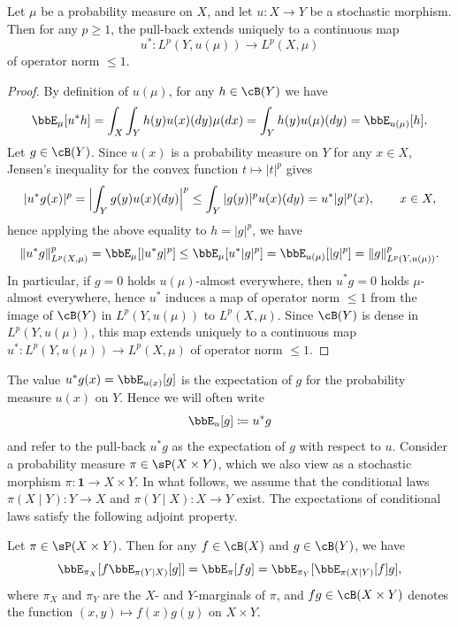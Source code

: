 \documentclass[12pt,reqno]{amsart}%
\theoremstyle{plain}
\theoremstyle{definition}
\def\abs#1{|#1|}
\def\dabs#1{\Vert#1\Vert}
\def\bsone{\boldsymbol{1}}
\begin{document}
\begin{lemma}\label{lem: Lp}
	Let $\mu$ be a probability measure on $X$, and let $u\colon X\rightarrow Y$ be a stochastic morphism.
	Then for any $p\geq1$, the pull-back extends uniquely to a continuous map
	\[
		u^*\colon L^p(Y,u(\mu))\rightarrow L^p(X,\mu)
	\]
	of operator norm $\leq1$.
\end{lemma}

\begin{proof}
	By definition of $u(\mu)$, for any $h\in\cB(Y)$ we have
	\[
		\bbE_\mu[u^*h]=\int_X\int_Yh(y)u(x)(dy)\mu(dx)=\int_Yh(y)u(\mu)(dy)=\bbE_{u(\mu)}[h].
	\]
	Let $g\in\cB(Y)$.  Since $u(x)$ is a probability measure on $Y$ for any $x\in X$,
	Jensen's inequality for the convex function $t\mapsto\abs{t}^p$ gives
	\[
		\abs{u^*g(x)}^p=\Bigl|\int_Yg(y)u(x)(dy)\Bigr|^p\leq\int_Y\abs{g(y)}^pu(x)(dy)=u^*\abs{g}^p(x),
		\qquad x\in X,
	\]
	hence applying the above equality to $h=\abs{g}^p$, we have
	\[
		\dabs{u^*g}^p_{L^p(X,\mu)}=\bbE_\mu[\abs{u^*g}^p]\leq\bbE_\mu[u^*\abs{g}^p]
		=\bbE_{u(\mu)}[\abs{g}^p]=\dabs{g}^p_{L^p(Y,u(\mu))}.
	\]
	In particular, if $g=0$ holds $u(\mu)$-almost everywhere, then $u^*g=0$ holds $\mu$-almost everywhere,
	hence $u^*$ induces a map of operator norm $\leq1$ from the image of $\cB(Y)$ in $L^p(Y,u(\mu))$
	to $L^p(X,\mu)$.  Since $\cB(Y)$ is dense in $L^p(Y,u(\mu))$, this map extends uniquely to a continuous map
	$u^*\colon L^p(Y,u(\mu))\rightarrow L^p(X,\mu)$ of operator norm $\leq1$.
\end{proof}

The value $u^*g(x)=\bbE_{u(x)}[g]$ is the expectation of $g$ for the probability measure $u(x)$ on $Y$.
Hence we will often write
\[
	\bbE_u[g]\coloneqq u^*g
\]
and refer to the pull-back $u^*g$ as the expectation of $g$ with respect to $u$.
Consider a probability measure $\pi\in\sP(X\times Y)$, which we also
view as a stochastic morphism $\pi\colon\bsone\rightarrow X\times Y$.
In what follows, we assume that
the conditional laws $\pi(X\mid Y)\colon Y\rightarrow X$ and $\pi(Y\mid X)\colon X\rightarrow Y$ exist.
The expectations of conditional laws satisfy the following adjoint property.

\begin{lemma}\label{lem: CE}
	Let $\pi\in\sP(X\times Y)$.
	Then for any $f\in\cB(X)$ and $g\in\cB(Y)$, we have
	\begin{equation}\label{eq: adjoint}
		\bbE_{\pi_X}[f \bbE_{\pi(Y\mid X)}[g]] =
		\bbE_\pi[fg]=\bbE_{\pi_Y}[\bbE_{\pi(X\mid Y)}[f] g  ],
	\end{equation}
	where $\pi_X$ and $\pi_Y$ are the $X$- and $Y$-marginals of $\pi$,
	and $fg\in\cB(X\times Y)$ denotes the function $(x,y)\mapsto f(x)g(y)$
	on $X\times Y$.
\end{lemma}
\end{document}
